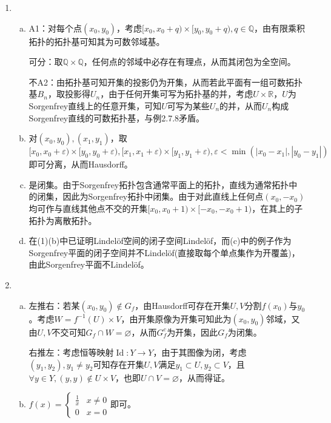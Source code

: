 \documentclass[a4paper,UTF8,fontset=windows]{ctexart}
\DeclareMathOperator{\Id}{Id}
\begin{document}
\begin{enumerate}[(1)]
    \item
    \begin{enumerate}[(a)]
    \item
    A1：对每个点$(x_0,y_0)$，考虑$[x_0,x_0+q)\times[y_0,y_0+q),q\in\mathbb{Q}$，由有限乘积拓扑的拓扑基可知其为可数邻域基。
    
    可分：取$\mathbb{Q}\times\mathbb{Q}$，任何点的邻域中必存在有理点，从而其闭包为全空间。
    
    不A2：由拓扑基可知开集的投影仍为开集，从而若此平面有一组可数拓扑基$B_n$，取投影得$U_n$，由于任何开集可写为拓扑基的并，考虑$U\times\mathbb{R}$，$U$为Sorgenfrey直线上的任意开集，可知$U$可写为某些$U_n$的并，从而$U_n$构成Sorgenfrey直线的可数拓扑基，与例2.7.8矛盾。
    
    \item
    对$(x_0,y_0),(x_1,y_1)$，取$[x_0,x_0+\varepsilon)\times[y_0,y_0+\varepsilon),[x_1,x_1+\varepsilon)\times[y_1,y_1+\varepsilon),\varepsilon<\min(|x_0-x_1|,|y_0-y_1|)$即可分离，从而Hausdorff。
    
    \item
    是闭集。由于Sorgenfrey拓扑包含通常平面上的拓扑，直线为通常拓扑中的闭集，因此为Sorgenfrey拓扑中闭集。由于对此直线上任何点$(x_0,-x_0)$均可作与直线其他点不交的开集$[x_0,x_0+1)\times[-x_0,-x_0+1)$，在其上的子拓扑为离散拓扑。
    
    \item
    在(1)(b)中已证明Lindel\"of空间的闭子空间Lindel\"of，而(c)中的例子作为Sorgenfrey平面的闭子空间并不Lindel\"of(直接取每个单点集作为开覆盖)，由此Sorgenfrey平面不Lindel\"of。
    \end{enumerate}
    
    \item
    \begin{enumerate}[(a)]
    \item
    左推右：若某$(x_0,y_0)\notin G_f$，由Hausdorff可存在开集$U,V$分割$f(x_0)$与$y_0$。考虑$W=f^{-1}(U)\times V$，由开集原像为开集可知此为$(x_0,y_0)$邻域，又由$U,V$不交可知$G_f\cap W=\varnothing$，从而$G_f^c$为开集，因此$G_f$为闭集。
    
    右推左：考虑恒等映射$\Id:Y\to Y$，由于其图像为闭，考虑$(y_1,y_2),y_1\ne y_2$可知存在开集$U,V$满足$y_1\subset U,y_2\subset V$，且$\forall y\in Y,(y,y)\notin U\times V$，也即$U\cap V=\varnothing$，从而得证。
    
    \item
    $f(x)=\begin{cases}\frac{1}{x}&x\ne0\\0&x=0\end{cases}$即可。
    

\end{enumerate}
\end{enumerate}
\end{document}
